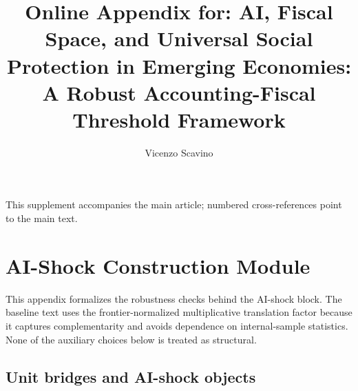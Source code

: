 \documentclass[11pt,a4paper]{article}
\title{Online Appendix for: AI, Fiscal Space, and Universal Social Protection in Emerging Economies: A Robust Accounting-Fiscal Threshold Framework}
\author{Vicenzo Scavino}
\affil{}
\date{}
\begin{document}
\maketitle

\noindent This supplement accompanies the main article; numbered cross-references point to the main text.

\appendix
\section{AI-Shock Construction Module}\label{app:ai_shock_module}

This appendix formalizes the robustness checks behind the AI-shock block. The baseline text uses the frontier-normalized multiplicative translation factor because it captures complementarity and avoids dependence on internal-sample statistics. None of the auxiliary choices below is treated as structural.

\subsection{Unit bridges and AI-shock objects}\label{subsec:unit_bridges_objects}
\end{document}

